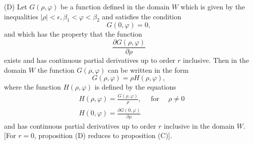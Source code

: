 \documentclass[10pt,a5paper]{book}
\makeatletter
\theoremstyle{plain}
\theoremstyle{definition}
\theoremstyle{remark}
\renewenvironment{proof}[1][\proofname]{\par
  \pushQED{\qed}%
  \normalfont\topsep6\p@\@plus6\p@\relax
  \trivlist
  \item\relax{\itshape #1\@addpunct{.}}\hspace\labelsep\ignorespaces
}{\popQED\endtrivlist\@endpefalse}
\makeatother
\begin{document}
\begin{proof}
(D) Let $G(\rho, \varphi)$ be a function defined in the domain $W$ which is given by the inequalities $|\rho|<\epsilon, \beta_{1}<\varphi<\beta_{2}$ and satisfies the condition
\begin{equation*}
G(0, \varphi)=0, \tag{29}
\end{equation*}
and which has the property that the function
\[
\frac{\partial G(\rho, \varphi)}{\partial \rho}
\]
exists and has continuous partial derivatives up to order $r$ inclusive. Then in the domain $W$ the function $G(\rho, \varphi)$ can be written in the form
\begin{equation*}
G(\rho, \varphi)=\rho H(\rho, \varphi), \tag{30}
\end{equation*}
where the function $H(\rho, \varphi)$ is defined by the equations
\begin{align*}
& H(\rho, \varphi)=\frac{G(\rho, \varphi)}{\rho}, \quad \text { for } \quad \rho \neq 0  \tag{31}\\
& H(0, \varphi)=\frac{\partial G(0, \varphi)}{\partial \rho}
\end{align*}
and has continuous partial derivatives up to order $r$ inclusive in the domain $W$. [For $r=0$, proposition (D) reduces to proposition (C)].


\end{proof}
\end{document}
